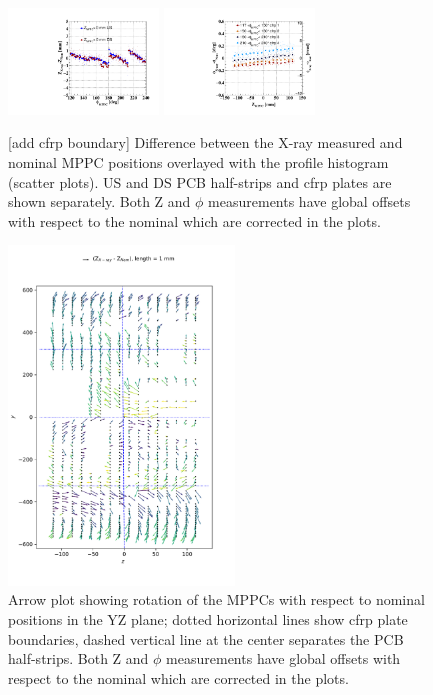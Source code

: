 \begin{figure}
\includegraphics[width=4cm]{plots/dz_boardrotation.pdf}
\includegraphics[width=4cm]{plots/dphi_boardrotation.pdf}\\
\caption{[add cfrp boundary]
Difference between the X-ray measured and nominal MPPC positions
overlayed with the profile histogram (scatter plots).
US and DS PCB half-strips and cfrp plates are shown separately.
Both Z and $\phi$ measurements have global offsets with respect to the 
nominal which are corrected in the plots.
}
\label{fig:rotation1}
\end{figure}

\begin{figure}
\begin{center}
\includegraphics[width=6cm]{plots/dzdy2017_rx_test.pdf}
\caption{Arrow plot showing rotation of the MPPCs with respect to nominal
positions in the YZ plane; dotted horizontal lines show cfrp plate boundaries,
dashed vertical line at the center separates the PCB half-strips.
Both Z and $\phi$ measurements have global offsets with respect to the 
nominal which are corrected in the plots.
}
\label{fig:rotation2}
\end{center}
\end{figure}


